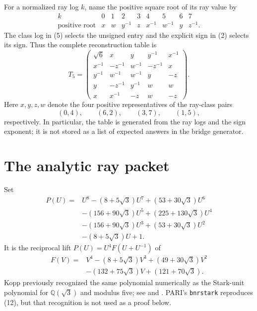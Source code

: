 \documentclass[11pt]{article}
\newcommand{\Q}{\mathbb Q}
\begin{document}
For a normalized ray log $k$, name the positive square root of its
ray value by
\[
\begin{array}{c|cccccccc}
k&0&1&2&3&4&5&6&7\\ \hline
\text{positive root}&x&w&y^{-1}&z&x^{-1}&w^{-1}&y&z^{-1}.
\end{array}
\]
The class log in (5) selects the unsigned entry and the explicit sign
in (2) selects its sign.  Thus the complete reconstruction table is
\[
T_5=
\begin{pmatrix}
\sqrt6&x&y&y^{-1}&x^{-1}\\
x^{-1}&-z^{-1}&w^{-1}&-z^{-1}&x\\
y^{-1}&w^{-1}&w^{-1}&y&-z\\
y&-z^{-1}&y^{-1}&w&w\\
x&x^{-1}&-z&w&-z
\end{pmatrix}.
\tag{9}
\]
Here $x,y,z,w$ denote the four positive representatives of
the ray-class pairs
\[
(0,4),\qquad(6,2),\qquad(3,7),\qquad(1,5),
\tag{10}
\]
respectively.  In particular, the table is generated from the ray logs
and the sign exponent; it is not stored as a list of expected answers in
the bridge generator.

\section{The analytic ray packet}

Set
\[
\begin{aligned}
P(U)={}&U^8-(8+5\sqrt3)U^7+(53+30\sqrt3)U^6\\
&-(156+90\sqrt3)U^5+(225+130\sqrt3)U^4\\
&-(156+90\sqrt3)U^3+(53+30\sqrt3)U^2\\
&-(8+5\sqrt3)U+1.
\end{aligned}
\tag{11}
\]
It is the reciprocal lift $P(U)=U^4F(U+U^{-1})$ of
\[
\begin{aligned}
F(V)={}&V^4-(8+5\sqrt3)V^3+(49+30\sqrt3)V^2\\
&-(132+75\sqrt3)V+(121+70\sqrt3).
\end{aligned}
\tag{12}
\]
Kopp previously recognized the same polynomial numerically as the
Stark-unit polynomial for $\Q(\sqrt3)$ and modulus five; see
\cite[\S7, (7.21)]{Kopp2021} and
\cite[Example~1.17, (3.12)]{Kopp2023}.  PARI's \texttt{bnrstark}
reproduces (12), but that recognition is not used as a proof below.
\end{document}
